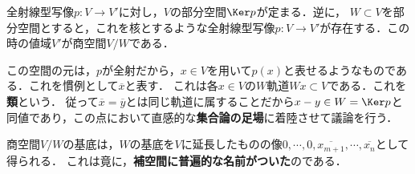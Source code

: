 \documentclass[uplatex, dvipdfmx]{jsreport}
\begin{document}
\begin{tcolorbox}[colframe=ForestGreen, colback=ForestGreen!10!white, breakable, title=商空間とは指定した部分空間に対して全射線型写像に導かれる空間である]
    全射線型写像$p:V\to V'$に対し，$V$の部分空間$\Ker p$が定まる．逆に，
    $W\subset V$を部分空間とすると，これを核とするような全射線型写像$p:V\to V'$が存在する．この時の値域$V'$が商空間$V/W$である．

    この空間の元は，$p$が全射だから，$x\in V$を用いて$p(x)$と表せるようなものである．これを慣例として$\overline{x}$と表す．
    これは各$x\in V$の$W$軌道$Wx\subset V$である．これを\textbf{類}という．
    従って$\overline{x}=\overline{y}$とは同じ軌道に属することだから$x-y\in W=\Ker p$と同値であり，この点において直感的な\textbf{集合論の足場}に着陸させて議論を行う．

    商空間$V/W$の基底は，$W$の基底を$V$に延長したものの像$0,\cdots,0,\overline{x_{m+1}},\cdots,\overline{x_n}$として得られる．
    これは竟に，\textbf{補空間に普遍的な名前がついた}のである．
\end{tcolorbox}
\end{document}

